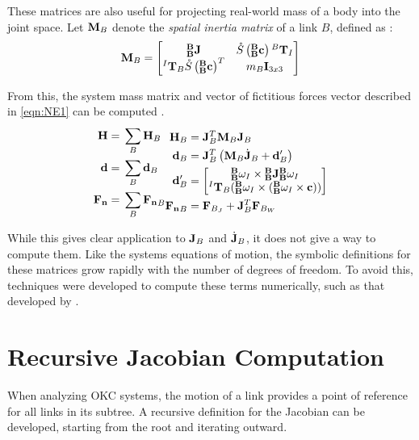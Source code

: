 These matrices are also useful for projecting real-world mass of a body into the joint space. Let $\mathbf{M}_B$ denote the \emph{spatial inertia matrix} of a link $B$, defined as \Cite{featherstone_2007}:
\begin{align} \label{eqn:spat_mass}
	\mathbf{M}_B =
	\begin{bmatrix}
	^\mathbf{B}_\mathbf{B}\mathbf{J}                 & \mathring{S}\left(^\mathbf{B}_\mathbf{B}\mathbf{c}\right){^B\mathbf{T}_I} \\
	{^I\mathbf{T}_B}\mathring{S}\left(^\mathbf{B}_\mathbf{B}\mathbf{c}\right)^T & m_B {\mathbf{I}}_{3x3}      
	\end{bmatrix}
\end{align}

\noindent From this, the system mass matrix and vector of fictitious forces vector described in \ref{eqn:NE1} can be computed \Cite{isenberg_2020}.
\begin{align} \label{eqn:NE2}
	\begin{split}
	{\mathbf{H}}    & = \Big.\sum_B {\mathbf{H}}_B                           \\
	{\mathbf{d}}    & = \Big.\sum_B {\mathbf{d}}_B                           \\
	{\mathbf{F_n}}   & =  \Big.\sum_B {\mathbf{F_n}}_B                         
	\end{split}
	\begin{split}
	{\mathbf{H}}_B  & = {\mathbf{J}^T_B}\mathbf{M}_B\mathbf{J}_B                           \\
	{\mathbf{d}}_B  & = \mathbf{J}^T_B \left (\mathbf{M}_B \dot{\mathbf{J}}_B + {\mathbf{d}}'_B \right) \\
	{\mathbf{d}}_B' & = \begin{bmatrix}                            
	{^\mathbf{B}_\mathbf{B}\omega_I } \times {^\mathbf{B}_\mathbf{B}\mathbf{J}} {^\mathbf{B}_\mathbf{B}\omega_I} \\
	{^I\mathbf{T}_B}  (^\mathbf{B}_\mathbf{B}\omega_I \times (^\mathbf{B}_\mathbf{B}\omega_I \times \mathbf{c}))\\
	\end{bmatrix} \\
	{\mathbf{F_n}}_B & = {\mathbf{F}}_{B_J} + \mathbf{J}_B^T {\mathbf{F}}_{B_W}
	\end{split} 
\end{align}

\noindent While this gives clear application to {$\mathbf{J}_B$} and $\dot{\mathbf{J}}_B$, it does not give a way to compute them. Like the systems equations of motion, the symbolic definitions for these matrices grow rapidly with the number of degrees of freedom. To avoid this, techniques were developed to compute these terms numerically, such as that developed by \Cite{isenberg_2020}.

\section{Recursive Jacobian Computation}
\noindent When analyzing OKC systems, the motion of a link provides a point of reference for all links in its subtree. A recursive definition for the Jacobian can be developed, starting from the root and iterating outward. %

